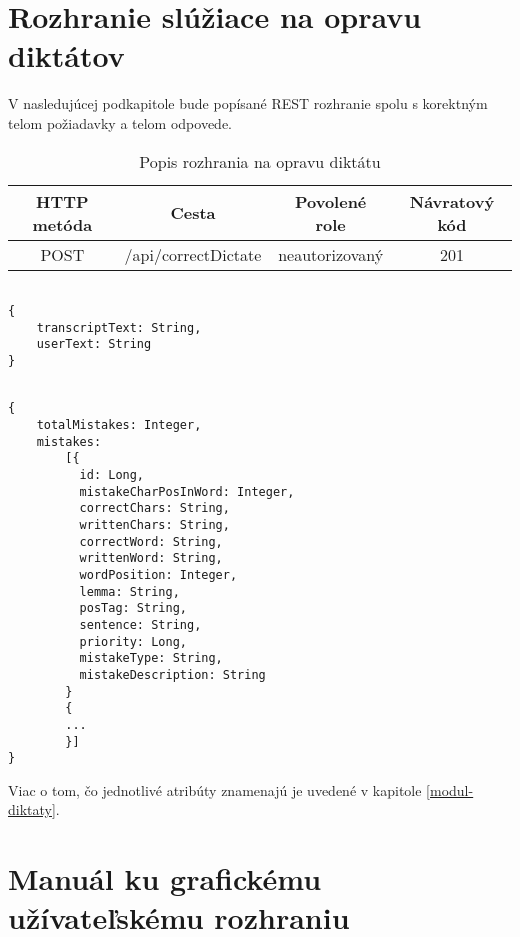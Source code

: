 \documentclass[12pt,oneside]{fithesis2}
\begin{document}
      \section{Rozhranie slúžiace na opravu diktátov} \label{navod_oprava}
      \par V nasledujúcej podkapitole bude popísané REST rozhranie spolu s korektným telom požiadavky a telom odpovede.
\begin{table}[htbp]
\centering
\begin{tabular}{@{}|c|c|c|c|@{}}
\hline
\textbf{HTTP metóda} & \textbf{Cesta} & \textbf{Povolené role} & \textbf{Návratový kód}  \\ \hline
           POST     &  /api/correctDictate         &     neautorizovaný       &    201        \\ \hline
\end{tabular}
\caption{Popis rozhrania na opravu diktátu}
\label{rozhranie-oprava}
\end{table}
\lstset{language=Java}          %
\begin{lstlisting}[frame=single]  % Start your code-block

{ 
	transcriptText: String,
	userText: String
}
\end{lstlisting}
\bigskip
\lstset{language=Java}          %
\begin{lstlisting}[frame=single]  % Start your code-block

{ 
	totalMistakes: Integer,
	mistakes: 
		[{ 
		  id: Long,
		  mistakeCharPosInWord: Integer,
		  correctChars: String,
		  writtenChars: String,
		  correctWord: String,
		  writtenWord: String,
		  wordPosition: Integer,
		  lemma: String,
		  posTag: String,
		  sentence: String,
		  priority: Long,
		  mistakeType: String,
		  mistakeDescription: String 	
		}
		{
		...
		}]	
}
\end{lstlisting}
\bigskip
\par Viac o tom, čo jednotlivé atribúty znamenajú je uvedené v kapitole \ref{modul-diktaty}.


      \section{Manuál ku grafickému užívateľskému rozhraniu}
\end{document}
